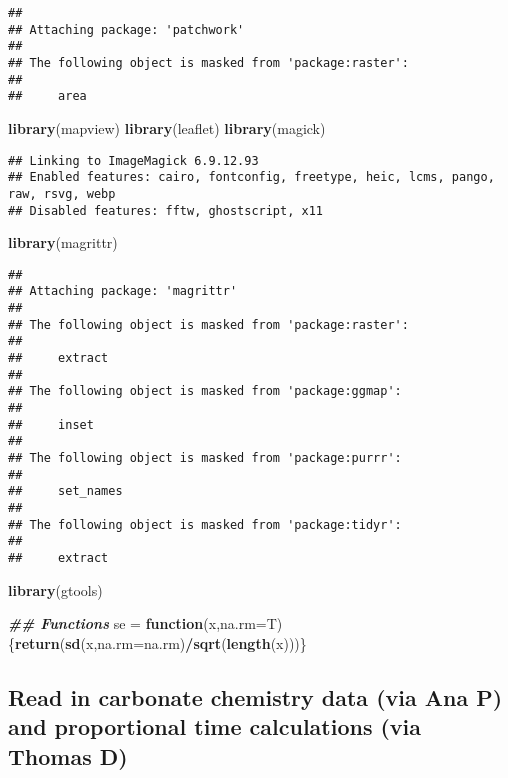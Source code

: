 \documentclass[
]{article}
\newenvironment{Shaded}{\begin{snugshade}}{\end{snugshade}}
\newcommand{\AttributeTok}[1]{\textcolor[rgb]{0.13,0.29,0.53}{#1}}
\newcommand{\ControlFlowTok}[1]{\textcolor[rgb]{0.13,0.29,0.53}{\textbf{#1}}}
\newcommand{\DocumentationTok}[1]{\textcolor[rgb]{0.56,0.35,0.01}{\textbf{\textit{#1}}}}
\newcommand{\FunctionTok}[1]{\textcolor[rgb]{0.13,0.29,0.53}{\textbf{#1}}}
\newcommand{\NormalTok}[1]{#1}
\newcommand{\OtherTok}[1]{\textcolor[rgb]{0.56,0.35,0.01}{#1}}
\newcommand{\SpecialCharTok}[1]{\textcolor[rgb]{0.81,0.36,0.00}{\textbf{#1}}}
\begin{document}
\begin{verbatim}
## 
## Attaching package: 'patchwork'
## 
## The following object is masked from 'package:raster':
## 
##     area
\end{verbatim}

\begin{Shaded}
\begin{Highlighting}[]
\FunctionTok{library}\NormalTok{(mapview)}
\FunctionTok{library}\NormalTok{(leaflet)}
\FunctionTok{library}\NormalTok{(magick)}
\end{Highlighting}
\end{Shaded}

\begin{verbatim}
## Linking to ImageMagick 6.9.12.93
## Enabled features: cairo, fontconfig, freetype, heic, lcms, pango, raw, rsvg, webp
## Disabled features: fftw, ghostscript, x11
\end{verbatim}

\begin{Shaded}
\begin{Highlighting}[]
\FunctionTok{library}\NormalTok{(magrittr)}
\end{Highlighting}
\end{Shaded}

\begin{verbatim}
## 
## Attaching package: 'magrittr'
## 
## The following object is masked from 'package:raster':
## 
##     extract
## 
## The following object is masked from 'package:ggmap':
## 
##     inset
## 
## The following object is masked from 'package:purrr':
## 
##     set_names
## 
## The following object is masked from 'package:tidyr':
## 
##     extract
\end{verbatim}

\begin{Shaded}
\begin{Highlighting}[]
\FunctionTok{library}\NormalTok{(gtools)}

\DocumentationTok{\#\# Functions}
\NormalTok{se }\OtherTok{=} \ControlFlowTok{function}\NormalTok{(x,}\AttributeTok{na.rm=}\NormalTok{T)\{}\FunctionTok{return}\NormalTok{(}\FunctionTok{sd}\NormalTok{(x,}\AttributeTok{na.rm=}\NormalTok{na.rm)}\SpecialCharTok{/}\FunctionTok{sqrt}\NormalTok{(}\FunctionTok{length}\NormalTok{(x)))\}}
\end{Highlighting}
\end{Shaded}

\hypertarget{read-in-carbonate-chemistry-data-via-ana-p-and-proportional-time-calculations-via-thomas-d}{%
\subsection{Read in carbonate chemistry data (via Ana P) and
proportional time calculations (via Thomas
D)}\label{read-in-carbonate-chemistry-data-via-ana-p-and-proportional-time-calculations-via-thomas-d}}
\end{document}
